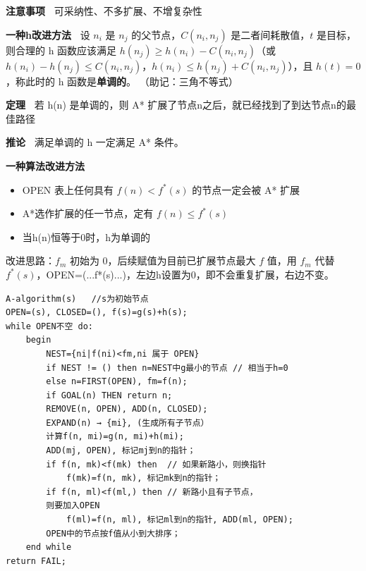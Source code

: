\documentclass[b4paper, 10pt]{ctexart}
\begin{document}
\begin{multicols}{3}
\textbf{注意事项\ } 可采纳性、不多扩展、不增复杂性


\textbf{一种h改进方法\ } 设 $n_i$ 是 $n_j$ 的父节点，$C(n_i,n_j)$ 是二者间耗散值，$t$ 是目标，则合理的 h 函数应该满足 $h(n_j)\ge h(n_i)-C(n_i,n_j)$（或 $h(n_i) - h(n_j) \le C(n_i,n_j)$，$h(n_i)\le h(n_j)+C(n_i,n_j)$），且 $h(t)=0$，称此时的 h 函数是\textbf{单调的}。
（助记：三角不等式）

\textbf{定理\ } 若 h(n) 是单调的，则 A* 扩展了节点n之后，就已经找到了到达节点n的最佳路径

\textbf{推论\ } 满足单调的 h 一定满足 A* 条件。

\textbf{一种算法改进方法} 

\begin{itemize}
    \item OPEN 表上任何具有 $f(n)<f^*(s)$ 的节点一定会被 A* 扩展
    \item A*选作扩展的任一节点，定有 $f(n)\le f^*(s)$
    \item 当h(n)恒等于0时，h为单调的
\end{itemize}

改进思路：$f_m$ 初始为 0，后续赋值为目前已扩展节点最大 $f$ 值，用 $f_m$ 代替 $f^*(s)$，OPEN=(...f*(s)...)，左边h设置为0，即不会重复扩展，右边不变。

\begin{lstlisting}[basicstyle=\tiny \ttfamily]
A-algorithm(s)   //s为初始节点
OPEN=(s), CLOSED=(), f(s)=g(s)+h(s);
while OPEN不空 do:
    begin
        NEST={ni|f(ni)<fm,ni 属于 OPEN}
        if NEST != () then n=NEST中g最小的节点 // 相当于h=0
        else n=FIRST(OPEN), fm=f(n);
        if GOAL(n) THEN return n;
        REMOVE(n, OPEN), ADD(n, CLOSED);
        EXPAND(n) → {mi}, (生成所有子节点）
        计算f(n, mi)=g(n, mi)+h(mi);
        ADD(mj, OPEN), 标记mj到n的指针；
        if f(n, mk)<f(mk) then  // 如果新路小，则换指针
            f(mk)=f(n, mk), 标记mk到n的指针；
        if f(n, ml)<f(ml,) then // 新路小且有子节点，
        则要加入OPEN
            f(ml)=f(n, ml), 标记ml到n的指针, ADD(ml, OPEN);
        OPEN中的节点按f值从小到大排序；
    end while
return FAIL;
\end{lstlisting}


\end{multicols}
\end{document}
